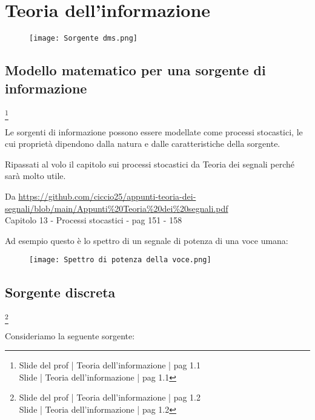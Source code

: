 \chapter{Teoria dell'informazione}

\begin{figure}[h]
    \centering
    \texttt{[image: Sorgente dms.png]}
\end{figure}

\newpage 

\section{Modello matematico per una sorgente di informazione}
\footnote{Slide del prof | Teoria dell'informazione | pag 1.1 \\  
Slide | Teoria dell'informazione | pag 1.1 
 }

Le sorgenti di informazione possono essere modellate come processi stocastici, 
le cui proprietà dipendono dalla natura e dalle caratteristiche della sorgente. \newline 

\begin{tcolorbox}
    Ripassati al volo il capitolo sui processi stocastici da Teoria dei segnali perché sarà molto utile. \newline 
    
    Da \url{https://github.com/ciccio25/appunti-teoria-dei-segnali/blob/main/Appunti%20Teoria%20dei%20segnali.pdf} \\
    Capitolo 13 - Processi stocastici - pag 151 - 158
\end{tcolorbox}

Ad esempio questo è lo spettro di un segnale di potenza di una voce umana: 

\begin{figure}[h]
    \centering
    \texttt{[image: Spettro di potenza della voce.png]}
\end{figure}

\newpage 

\section{Sorgente discreta}
\footnote{Slide del prof | Teoria dell'informazione | pag 1.2 \\
Slide | Teoria dell'informazione | pag 1.2 
}

Consideriamo la seguente sorgente: 

